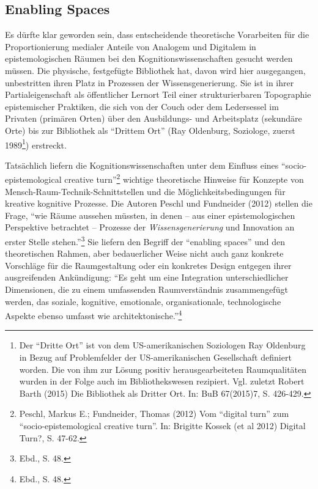 \documentclass[a4paper,
fontsize=11pt,
oneside,
numbers=noperiodatend,
parskip=half-,
bibliography=totoc,
final
]{scrartcl}
\begin{document}
\subsection*{Enabling Spaces}\label{enabling-spaces}

Es dürfte klar geworden sein, dass entscheidende theoretische
Vorarbeiten für die Proportionierung medialer Anteile von Analogem und
Digitalem in epistemologischen Räumen bei den Kognitionswissenschaften
gesucht werden müssen. Die physische, festgefügte Bibliothek hat, davon
wird hier ausgegangen, unbestritten ihren Platz in Prozessen der
Wissensgenerierung. Sie ist in ihrer Partialeigenschaft als öffentlicher
Lernort Teil einer strukturierbaren Topographie epistemischer Praktiken,
die sich von der Couch oder dem Ledersessel im Privaten (primären Orten)
über den Ausbildungs- und Arbeitsplatz (sekundäre Orte) bis zur
Bibliothek als \enquote{Drittem Ort} (Ray Oldenburg, Soziologe, zuerst
1989\footnote{Der \enquote{Dritte Ort} ist von dem US-amerikanischen
  Soziologen Ray Oldenburg in Bezug auf Problemfelder der
  US-amerikanischen Gesellschaft definiert worden. Die von ihm zur
  Lösung positiv herausgearbeiteten Raumqualitäten wurden in der Folge
  auch im Bibliothekswesen rezipiert. Vgl. zuletzt Robert Barth (2015)
  Die Bibliothek als Dritter Ort. In: BuB 67(2015)7, S. 426-429.})
erstreckt.

Tatsächlich liefern die Kognitionswissenschaften unter dem Einfluss
eines \enquote{socio-epistemological creative turn}\footnote{Peschl,
  Markus E.; Fundneider, Thomas (2012) Vom \enquote{digital turn} zum
  \enquote{socio-epistemological creative turn}. In: Brigitte Kossek (et
  al 2012) Digital Turn?, S. 47-62.} wichtige theoretische Hinweise für
Konzepte von Mensch-Raum-Technik-Schnittstellen und die
Möglichkeitsbedingungen für kreative kognitive Prozesse. Die Autoren
Peschl und Fundneider (2012) stellen die Frage, \enquote{wie Räume
aussehen müssten, in denen -- aus einer epistemologischen Perspektive
betrachtet -- Prozesse der \emph{Wissensgenerierung} und Innovation an
erster Stelle stehen.}\footnote{Ebd., S. 48.} Sie liefern den Begriff
der \enquote{enabling spaces} und den theoretischen Rahmen, aber
bedauerlicher Weise nicht auch ganz konkrete Vorschläge für die
Raumgestaltung oder ein konkretes Design entgegen ihrer ausgreifenden
Ankündigung: \enquote{Es geht um eine Integration unterschiedlicher
Dimensionen, die zu einem umfassenden Raumverständnis zusammengefügt
werden, das soziale, kognitive, emotionale, organisationale,
technologische Aspekte ebenso umfasst wie architektonische.}\footnote{Ebd.,
  S. 48.}
\end{document}
